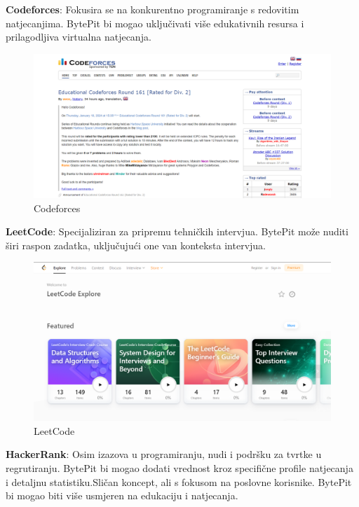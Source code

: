 		\begin{packed_item}
			\item \textbf{Codeforces}: Fokusira se na konkurentno programiranje s
			redovitim natjecanjima. BytePit bi mogao uključivati više edukativnih
			resursa i prilagodljiva virtualna natjecanja.
			
			\begin{figure}[H]
				\includegraphics[scale=0.45]{slike/codeforces.PNG}
				\centering
				\caption{Codeforces}
				\label{fig:codeforces}
			\end{figure}
			\eject
			
			\item \textbf{LeetCode}: Specijaliziran za pripremu tehničkih intervjua.
			BytePit može nuditi širi raspon zadatka, uključujući one van konteksta intervjua.
			
			\begin{figure}[H]
				\includegraphics[scale=0.4]{slike/leetcode.PNG}
				\centering
				\caption{LeetCode}
				\label{fig:leetcode}
			\end{figure}
			
			
			
			\item \textbf{HackerRank}: Osim izazova u programiranju, nudi i podršku
			za tvrtke u regrutiranju. BytePit bi mogao dodati vrednost kroz specifične
			profile natjecanja i detaljnu statistiku.Sličan koncept, ali s fokusom na
			poslovne korisnike. BytePit bi mogao biti više usmjeren na edukaciju i natjecanja.
			

\end{packed_item}
